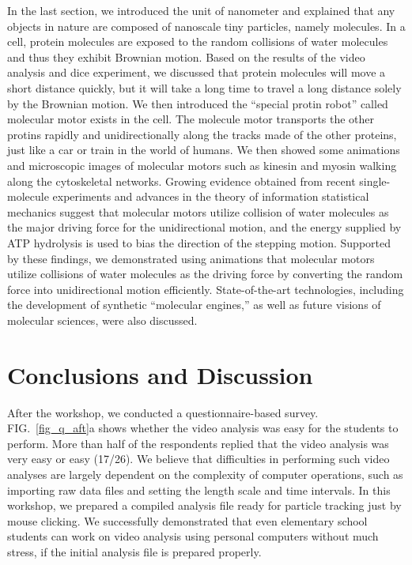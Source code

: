 \documentclass[10pt, aps, prb, preprint, longbibliography, superscriptaddress]{revtex4-2}
\newcommand{\figref}[1]{FIG.~\ref{#1}}
\begin{document}
In the last section, we introduced the unit of nanometer and explained that
any objects in nature are composed of nanoscale tiny particles, namely molecules.
In a cell, protein molecules are exposed to the random collisions of water molecules
and thus they exhibit Brownian motion.
Based on the results of the video analysis and dice experiment,
we discussed that protein molecules will move a short distance quickly,
but it will take a long time to travel a long distance solely by the Brownian motion.
We then introduced the ``special protin robot'' called molecular motor exists in the cell.
The molecule motor transports the other protins rapidly and unidirectionally along the tracks
made of the other proteins, just like a car or train in the world of humans.
We then showed some animations\cite{kinesin_mov}
and microscopic images of molecular motors such as kinesin and myosin\cite{kodera_2010}
walking along the cytoskeletal networks.
Growing evidence obtained from recent single-molecule experiments
and advances in the theory of information statistical mechanics suggest that
molecular motors utilize collision of water molecules as the major driving force
for the unidirectional motion,
and the energy supplied by ATP hydrolysis is used to bias the direction of the stepping motion.
\cite{busta_2001, shiroguchi_2007, sagawa_2010, toyabe_2010}
Supported by these findings, we demonstrated using animations
that molecular motors utilize collisions of water molecules as the driving force
by converting the random force into unidirectional motion efficiently.
State-of-the-art technologies, including the development of synthetic ``molecular engines,''
as well as future visions of molecular sciences, were also discussed.\cite{iino_2020, toyabe_2020, kinbara_2021}



\section{Conclusions and Discussion}
\label{sec:conclusions}

After the workshop, we conducted a questionnaire-based survey.
\figref{fig_q_aft}a shows whether the video analysis was easy for the students to perform.
More than half of the respondents replied that the video analysis was very easy or easy (17/26).
We believe that difficulties in performing such video analyses are
largely dependent on the complexity of computer operations,
such as importing raw data files and setting the length scale and time intervals.
In this workshop, we prepared a compiled analysis file ready for particle tracking just by mouse clicking.
We successfully demonstrated that even elementary school students can work on video analysis
using personal computers without much stress, if the initial analysis file is prepared properly.
\end{document}
